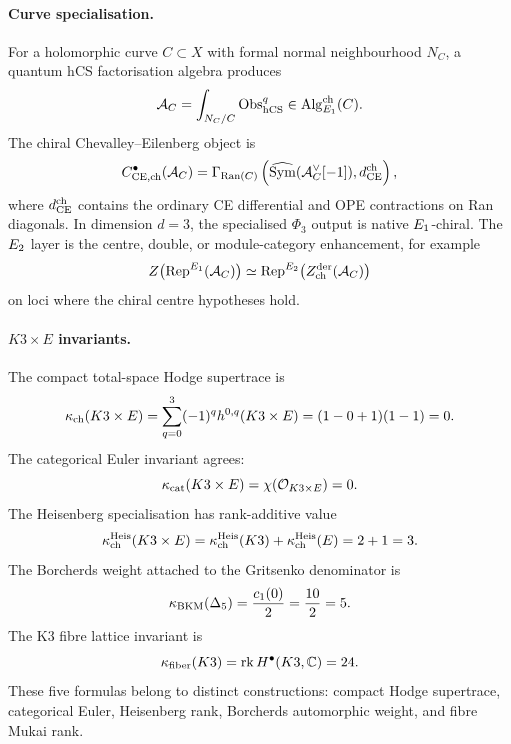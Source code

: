 \paragraph{Curve specialisation.}
For a holomorphic curve \(C\subset X\) with formal normal neighbourhood
\(N_C\), a quantum hCS factorisation algebra produces
\[
  \mathcal A_C
  =
  \int_{N_C/C}\mathrm{Obs}^q_{\mathrm{hCS}}
  \in
  \mathrm{Alg}^{\mathrm{ch}}_{E_1}(C).
\]
The chiral Chevalley--Eilenberg object is
\[
  C^\bullet_{\mathrm{CE},\mathrm{ch}}(\mathcal A_C)
  =
  \Gamma_{\mathrm{Ran}(C)}
  \left(
    \widehat{\mathrm{Sym}}(\mathcal A_C^\vee[-1]),
    d_{\mathrm{CE}}^{\mathrm{ch}}
  \right),
\]
where \(d_{\mathrm{CE}}^{\mathrm{ch}}\) contains the ordinary CE differential
and OPE contractions on Ran diagonals.  In dimension \(d=3\), the
specialised \(\Phi_3\) output is native \(E_1\)-chiral.  The
\(E_2\) layer is the centre, double, or module-category enhancement,
for example
\[
  Z\bigl(\mathrm{Rep}^{E_1}(\mathcal A_C)\bigr)
  \simeq
  \mathrm{Rep}^{E_2}\bigl(Z^{\mathrm{der}}_{\mathrm{ch}}(\mathcal A_C)\bigr)
\]
on loci where the chiral centre hypotheses hold.

\paragraph{\(K3\times E\) invariants.}
The compact total-space Hodge supertrace is
\[
  \kappa_{\mathrm{ch}}(K3\times E)
  =
  \sum_{q=0}^{3}(-1)^q h^{0,q}(K3\times E)
  =
  (1-0+1)(1-1)
  =
  0.
\]
The categorical Euler invariant agrees:
\[
  \kappa_{\mathrm{cat}}(K3\times E)=\chi(\mathcal O_{K3\times E})=0.
\]
The Heisenberg specialisation has rank-additive value
\[
  \kappa_{\mathrm{ch}}^{\mathrm{Heis}}(K3\times E)=\kappa_{\mathrm{ch}}^{\mathrm{Heis}}(K3)+\kappa_{\mathrm{ch}}^{\mathrm{Heis}}(E)=2+1=3.
\]
The Borcherds weight attached to the Gritsenko denominator is
\[
  \kappa_{\mathrm{BKM}}(\Delta_5)=\frac{c_1(0)}{2}=\frac{10}{2}=5.
\]
The K3 fibre lattice invariant is
\[
  \kappa_{\mathrm{fiber}}(K3)=\mathrm{rk}\,H^\bullet(K3,\mathbb C)=24.
\]
These five formulas belong to distinct constructions: compact Hodge
supertrace, categorical Euler, Heisenberg rank, Borcherds automorphic
weight, and fibre Mukai rank.
